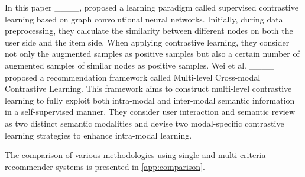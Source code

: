     In this paper ____, proposed a learning paradigm called supervised contrastive learning based on graph convolutional neural networks. Initially, during data preprocessing, they calculate the similarity between different nodes on both the user side and the item side. When applying contrastive learning, they consider not only the augmented samples as positive samples but also a certain number of augmented samples of similar nodes as positive samples. Wei et al. ____ proposed a recommendation framework called Multi-level Cross-modal Contrastive Learning. This framework aims to construct multi-level contrastive learning to fully exploit both intra-modal and inter-modal semantic information in a self-supervised manner. They consider user interaction and semantic review as two distinct semantic modalities and devise two modal-specific contrastive learning strategies to enhance intra-modal learning. 
    
    The comparison of various methodologies using single and multi-criteria recommender systems is presented in \ref{app:comparison}.